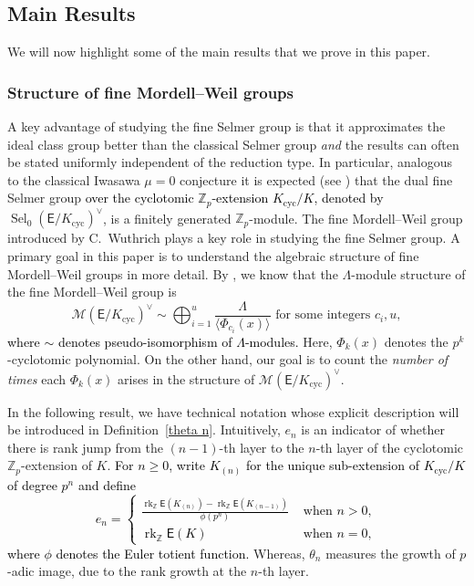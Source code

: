 \documentclass{amsart}
\newcommand{\edit}[1]{\textcolor{black}{#1}}
\numberwithin{equation}{section}
\theoremstyle{remark}
\newcommand{\rk}{\operatorname{rk}}
\newcommand{\EC}{\mathsf{E}}
\newcommand{\cM}{\mathcal{M}}
\newcommand{\Zp}{\mathbb{Z}_p}
\newcommand{\Z}{\mathbb{Z}}
\newcommand{\cyc}{\operatorname{{cyc}}}
\newcommand{\Sel}{\operatorname{Sel}}
\theoremstyle{plain} %
\begin{document}
\subsection*{Main Results}
We will now highlight some of the main results that we prove in this paper.


\subsubsection*{Structure of fine Mordell--Weil groups}

A key advantage of studying the fine Selmer group is that it approximates the ideal class group better than the classical Selmer group \textit{and} the results can often be stated uniformly independent of the reduction type.
In particular, analogous to the classical Iwasawa $\mu=0$ conjecture it is expected (see \cite[Conjecture~A]{CS05}) that the dual fine Selmer group \edit{over the cyclotomic $\Z_p$-extension $K_{\cyc}/K$, denoted by} $\Sel_0(\EC/K_{\cyc})^\vee$, is a finitely generated $\Zp$-module.
The fine Mordell--Weil group introduced by C.~Wuthrich \cite{Wut07} plays a key role in studying the fine Selmer group.
A primary goal in this paper is to understand the algebraic structure of fine Mordell--Weil groups in more detail.
By \cite[Theorem~3.3]{Lei23}, we know that the $\Lambda$-module structure of the fine Mordell--Weil group is
\[
\cM(\EC/K_{\cyc})^\vee \sim \bigoplus_{i=1}^{u} \frac{\Lambda}{\langle \Phi_{c_i}(x) \rangle} \text{ for some integers } c_i, u,
\]
\edit{where $\sim$ denotes pseudo-isomorphism of $\Lambda$-modules.}
Here, $\Phi_k(x)$ denotes the $p^k$-cyclotomic polynomial.
On the other hand, our goal is to count the \emph{number of times} each $\Phi_k(x)$ arises in the structure of $\cM(\EC/K_{\cyc})^\vee$.

In the following result, we have technical notation whose explicit description will be introduced in Definition~\ref{theta n}.
Intuitively, $e_n$ is an indicator of whether there is rank jump from the $(n-1)$-th layer to the $n$-th layer of the cyclotomic $\Zp$-extension of $K$.
\edit{For $n\ge0$, write $K_{(n)}$ for the unique sub-extension of $K_{\cyc}/K$ of degree $p^n$ and define 
\[
e_n=
\begin{cases}
\frac{\rk_{\Z}\EC(K_{(n)})-\rk_{\Z}\EC(K_{(n-1)})}{\phi(p^n)} & \text{ when } n>0,\\
\rk_{\Z}\EC(K) & \text{ when } n=0,
\end{cases}
\]
where  $\phi$ denotes the Euler totient function.}
Whereas, $\theta_n$ measures the growth of $p$-adic image, due to the rank growth at the $n$-th layer.
\end{document}
